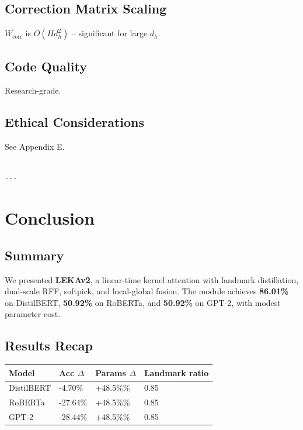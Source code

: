 \subsection{Correction Matrix Scaling}

$W_\text{corr}$ is $O(H d_h^2)$ -- significant for large $d_h$.

\subsection{Code Quality}

Research-grade.

\subsection{Ethical Considerations}

See Appendix E.
\begin{lstlisting}

---
\end{lstlisting}

\section{Conclusion}

\subsection{Summary}

We presented \textbf{LEKAv2}, a linear-time kernel attention with landmark 
distillation, dual-scale RFF, softpick, and local-global fusion. The 
module achieves \textbf{86.01\%} on DistilBERT, \textbf{50.92\%} on RoBERTa, 
and \textbf{50.92\%} on GPT-2, with modest parameter cost.

\subsection{Results Recap}

\begin{table}[H]
\centering
\small
\begin{tabular}{llll}
\toprule
\textbf{Model} & \textbf{Acc $\Delta$} & \textbf{Params $\Delta$} & \textbf{Landmark ratio} \\
\midrule
DistilBERT & -4.70\% & +48.5\%\% & 0.85 \\
RoBERTa & -27.64\% & +48.5\%\% & 0.85 \\
GPT-2 & -28.44\% & +48.5\%\% & 0.85 \\
\bottomrule
\end{tabular}
\end{table}

